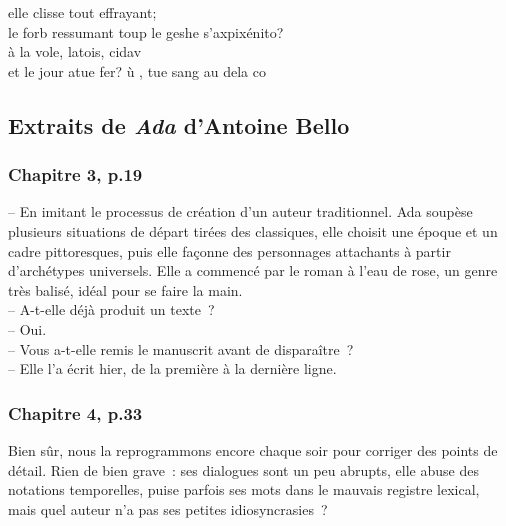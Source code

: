 \documentclass{article}
\begin{document}
				elle clisse tout effrayant;\\
				le forb ressumant toup le geshe s'axpixénito?\\
				à la vole, latois, cidav\\
				et le jour atue fer? ù , tue sang au dela co\\
			\newpage
		
		\subsection{Extraits de \textit{Ada} d'Antoine Bello}
			\subsubsection{Chapitre 3, p.19}\label{ada_elaboration}
				-- En imitant le processus de création d'un auteur traditionnel. Ada soupèse plusieurs situations de départ tirées des classiques, elle choisit une époque et un cadre pittoresques, puis elle façonne des personnages attachants à partir d'archétypes universels. Elle a commencé par le roman à l'eau de rose, un genre très balisé, idéal pour se faire la main.\\
				-- A-t-elle déjà produit un texte~?\\
				-- Oui.\\
				-- Vous a-t-elle remis le manuscrit avant de disparaître~?\\
				-- Elle l'a écrit hier, de la première à la dernière ligne.
			\subsubsection{Chapitre 4, p.33}\label{ada_bug}
				Bien sûr, nous la reprogrammons encore chaque soir pour corriger des points de détail. Rien de bien grave~: ses dialogues sont un peu abrupts, elle abuse des notations temporelles, puise parfois ses mots dans le mauvais registre lexical, mais quel auteur n'a pas ses petites idiosyncrasies~?
\end{document}
